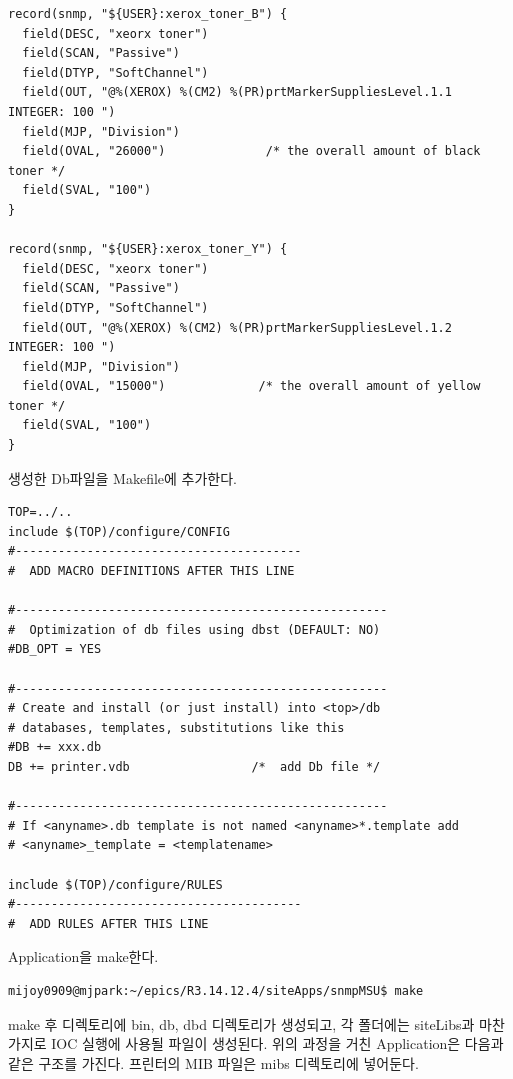 \documentclass[11pt
  , a4paper
  , article
  , oneside
]{memoir}
\begin{document}
{\scriptsize
\begin{lstlisting}[style=termstyle]
record(snmp, "${USER}:xerox_toner_B") {
  field(DESC, "xeorx toner")
  field(SCAN, "Passive")
  field(DTYP, "SoftChannel")
  field(OUT, "@%(XEROX) %(CM2) %(PR)prtMarkerSuppliesLevel.1.1  INTEGER: 100 ")
  field(MJP, "Division")
  field(OVAL, "26000")              /* the overall amount of black toner */ 
  field(SVAL, "100")
}

record(snmp, "${USER}:xerox_toner_Y") {
  field(DESC, "xeorx toner")
  field(SCAN, "Passive")
  field(DTYP, "SoftChannel")
  field(OUT, "@%(XEROX) %(CM2) %(PR)prtMarkerSuppliesLevel.1.2  INTEGER: 100 ")
  field(MJP, "Division")
  field(OVAL, "15000")             /* the overall amount of yellow toner */
  field(SVAL, "100")
}
\end{lstlisting}
}


\hfill

생성한 Db파일을 Makefile에 추가한다.

{\scriptsize
\begin{lstlisting}[style=termstylenumber]
TOP=../..
include $(TOP)/configure/CONFIG
#----------------------------------------
#  ADD MACRO DEFINITIONS AFTER THIS LINE

#----------------------------------------------------
#  Optimization of db files using dbst (DEFAULT: NO)
#DB_OPT = YES

#----------------------------------------------------
# Create and install (or just install) into <top>/db
# databases, templates, substitutions like this
#DB += xxx.db
DB += printer.vdb                 /*  add Db file */

#----------------------------------------------------
# If <anyname>.db template is not named <anyname>*.template add
# <anyname>_template = <templatename>

include $(TOP)/configure/RULES
#----------------------------------------
#  ADD RULES AFTER THIS LINE
\end{lstlisting}
}


\hfill

 Application을 make한다.

{\scriptsize
\begin{lstlisting}[style=termstyle]
mijoy0909@mjpark:~/epics/R3.14.12.4/siteApps/snmpMSU$ make
\end{lstlisting}
}



\hfill

make 후 디렉토리에 bin, db, dbd 디렉토리가 생성되고, 각 폴더에는 siteLibs과 마찬가지로 IOC 실행에 사용될 파일이 생성된다. 위의 과정을 거친 Application은 다음과 같은 구조를 가진다. 프린터의 MIB  파일은 mibs 디렉토리에 넣어둔다.
\end{document}

